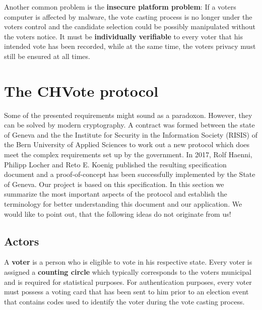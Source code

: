 Another common problem is the \textbf{insecure platform problem}: If a voters computer is affected by malware, the vote casting process is no longer under the voters control and the candidate selection could be possibly manipulated without the voters notice. It must be \textbf{individually verifiable} to every voter that his intended vote has been recorded, while at the same time, the voters privacy must still be ensured at all times. 

\section{The CHVote protocol}
Some of the presented requirements might sound as a paradoxon. However, they can be solved by modern cryptography. A contract was formed between the state of Geneva and the the Institute for Security in the Information Society (RISIS) of the Bern University of Applied Sciences to work out a new protocol which does meet the complex requirements set up by the government. In 2017, Rolf Haenni, Philipp Locher and Reto E. Koenig published the resulting specification document and a proof-of-concept has been successfully implemented by the State of Geneva. Our project is based on this specification. In this section we summarize the most important aspects of the protocol and establish the terminology for better understanding this document and our application. We would like to point out, that the following ideas do not originate from us!

\subsection{Actors}
A \textbf{voter} is a person who is eligible to vote in his respective state. Every voter is assigned a \textbf{counting circle} which typically corresponds to the voters municipal and is required for statistical purposes. For authentication purposes, every voter must possess a voting card that has been sent to him prior to an election event that contains codes used to identify the voter during the vote casting process.

